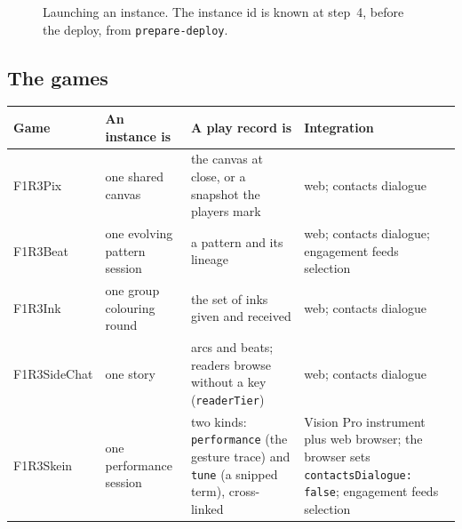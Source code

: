 \documentclass[11pt]{article}
\theoremstyle{definition}
\theoremstyle{remark}
\newcommand{\code}[1]{\texttt{#1}}
\newcommand{\Em}{Embers}
\begin{document}
\begin{figure}[ht]
\centering
{}
\caption{Launching an instance. The instance id is known at step~4, before the
deploy, from \code{prepare-deploy}.}
\label{fig:launch}
\end{figure}

\subsection{The games}

\begin{longtable}{@{}>{\raggedright\arraybackslash}p{}>{\raggedright\arraybackslash}p{}>{\raggedright\arraybackslash}p{}>{\raggedright\arraybackslash}p{}@{}}
\toprule
Game & An instance is & A play record is & Integration\\
\midrule
\endhead
F1R3Pix & one shared canvas & the canvas at close, or a snapshot the players mark &
  web; contacts dialogue\\
F1R3Beat & one evolving pattern session & a pattern and its lineage & web;
  contacts dialogue; engagement feeds selection\\
F1R3Ink & one group colouring round & the set of inks given and received & web;
  contacts dialogue\\
F1R3SideChat & one story & arcs and beats; readers browse without a key
  (\code{readerTier}) & web; contacts dialogue\\
F1R3Skein & one performance session & two kinds: \code{performance} (the
  gesture trace) and \code{tune} (a snipped term), cross-linked & Vision Pro
  instrument plus web browser; the browser sets \code{contactsDialogue: false};
  engagement feeds selection\\
\bottomrule
\end{longtable}
\end{document}
